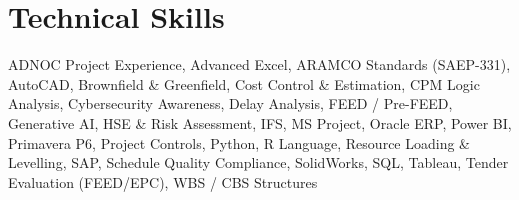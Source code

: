 \documentclass[11pt,a4paper]{article}
\begin{document}
\section{Technical Skills}
\noindent ADNOC Project Experience, Advanced Excel, ARAMCO Standards (SAEP-331), AutoCAD, Brownfield \& Greenfield, Cost Control \& Estimation, CPM Logic Analysis, Cybersecurity Awareness, Delay Analysis, FEED / Pre-FEED, Generative AI, HSE \& Risk Assessment, IFS, MS Project, Oracle ERP, Power BI, Primavera P6, Project Controls, Python, R Language, Resource Loading \& Levelling, SAP, Schedule Quality Compliance, SolidWorks, SQL, Tableau, Tender Evaluation (FEED/EPC), WBS / CBS Structures
\end{document}
